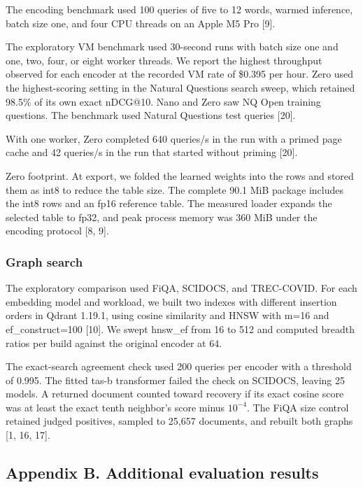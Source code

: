\documentclass[
  english,
  10pt,
]{article}
\begin{document}
The encoding benchmark used 100 queries of five to 12 words, warmed
inference, batch size one, and four CPU threads on an Apple M5 Pro
{[}9{]}.

The exploratory VM benchmark used 30-second runs with batch size one and
one, two, four, or eight worker threads. We report the highest
throughput observed for each encoder at the recorded VM rate of \$0.395
per hour. Zero used the highest-scoring setting in the Natural Questions
search sweep, which retained 98.5\% of its own exact nDCG@10. Nano and
Zero saw NQ Open training questions. The benchmark used Natural
Questions test queries {[}20{]}.

With one worker, Zero completed 640 queries/s in the run with a primed
page cache and 42 queries/s in the run that started without priming
{[}20{]}.

Zero footprint. At export, we folded the learned weights into the rows
and stored them as int8 to reduce the table size. The complete 90.1 MiB
package includes the int8 rows and an fp16 reference table. The measured
loader expands the selected table to fp32, and peak process memory was
360 MiB under the encoding protocol {[}8, 9{]}.

\subsubsection{Graph search}\label{graph-search}

The exploratory comparison used FiQA, SCIDOCS, and TREC-COVID. For each
embedding model and workload, we built two indexes with different
insertion orders in Qdrant 1.19.1, using cosine similarity and HNSW with
m=16 and ef\_construct=100 {[}10{]}. We swept hnsw\_ef from 16 to 512
and computed breadth ratios per build against the original encoder at
64.

The exact-search agreement check used 200 queries per encoder with a
threshold of 0.995. The fitted tas-b transformer failed the check on
SCIDOCS, leaving 25 models. A returned document counted toward recovery
if its exact cosine score was at least the exact tenth neighbor's score
minus \(10^{-4}\). The FiQA size control retained judged positives,
sampled to 25,657 documents, and rebuilt both graphs {[}1, 16, 17{]}.

\setcounter{figure}{0}
\renewcommand{\thefigure}{B\arabic{figure}}
\subsection{Appendix B. Additional evaluation
results}\label{appendix-b.-additional-evaluation-results}
\end{document}
